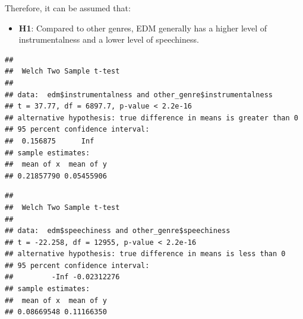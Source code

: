 \documentclass[
]{book}
\newenvironment{Shaded}{\begin{snugshade}}{\end{snugshade}}
\newcommand{\AttributeTok}[1]{\textcolor[rgb]{0.13,0.29,0.53}{#1}}
\newcommand{\ConstantTok}[1]{\textcolor[rgb]{0.56,0.35,0.01}{#1}}
\newcommand{\FunctionTok}[1]{\textcolor[rgb]{0.13,0.29,0.53}{\textbf{#1}}}
\newcommand{\NormalTok}[1]{#1}
\newcommand{\OtherTok}[1]{\textcolor[rgb]{0.56,0.35,0.01}{#1}}
\newcommand{\SpecialCharTok}[1]{\textcolor[rgb]{0.81,0.36,0.00}{\textbf{#1}}}
\newcommand{\StringTok}[1]{\textcolor[rgb]{0.31,0.60,0.02}{#1}}
\providecommand{\tightlist}{%
  \setlength{\itemsep}{0pt}\setlength{\parskip}{0pt}}
\begin{document}
Therefore, it can be assumed that:

\begin{itemize}
\tightlist
\item
  \textbf{H1}: Compared to other genres, EDM generally has a higher level of instrumentalness and a lower level of speechiness.
\end{itemize}

\begin{Shaded}
\end{Shaded}

\begin{verbatim}
## 
##  Welch Two Sample t-test
## 
## data:  edm$instrumentalness and other_genre$instrumentalness
## t = 37.77, df = 6897.7, p-value < 2.2e-16
## alternative hypothesis: true difference in means is greater than 0
## 95 percent confidence interval:
##  0.156875      Inf
## sample estimates:
##  mean of x  mean of y 
## 0.21857790 0.05455906
\end{verbatim}

\begin{Shaded}
\end{Shaded}

\begin{verbatim}
## 
##  Welch Two Sample t-test
## 
## data:  edm$speechiness and other_genre$speechiness
## t = -22.258, df = 12955, p-value < 2.2e-16
## alternative hypothesis: true difference in means is less than 0
## 95 percent confidence interval:
##         -Inf -0.02312276
## sample estimates:
##  mean of x  mean of y 
## 0.08669548 0.11166350
\end{verbatim}
\end{document}
